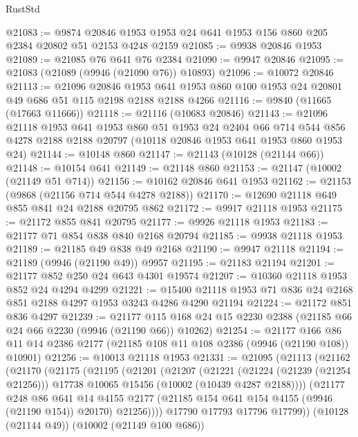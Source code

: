\begin{lexlean}{RustStd}
\begin{coremodule}
@21083 := @9874 @20846 @1953 @1953 @24 @641 @1953 @156 @860 @205 @2384 @20802 @51 @2153 @4248 @2159
@21085 := @9938 @20846 @1953
@21089 := @21085 @76 @641 @76 @2384
@21090 := @9947 @20846
@21095 := @21083 (@21089 (@9946 (@21090 @76)) @10893)
@21096 := @10072 @20846
@21113 := @21096
    @20846
    @1953
    @641
    @1953
    @860
    @100
    @1953
    @24
    @20801
    @49
    @686
    @51
    @115
    @2198
    @2188
    @2188
    @4266
@21116 := @9840 (@11665 (@17663 @11666))
@21118 := @21116 (@10683 @20846)
@21143 := @21096
    @21118
    @1953
    @641
    @1953
    @860
    @51
    @1953
    @24
    @2404
    @66
    @714
    @544
    @856
    @4278
    @2188
    @2188
    @20797
    (@10118 @20846 @1953 @641 @1953 @860 @1953 @24)
@21144 := @10148 @860
@21147 := @21143 (@10128 (@21144 @66))
@21148 := @10154 @641
@21149 := @21148 @860
@21153 := @21147 (@10002 (@21149 @51 @714))
@21156 := @10162 @20846 @641 @1953
@21162 := @21153 (@9868 (@21156 @714 @544 @4278 @2188))
@21170 := @12690 @21118 @649 @855 @841 @24 @2188 @20795 @862
@21172 := @9917 @21118 @1953
@21175 := @21172 @855 @841 @20795
@21177 := @9926 @21118 @1953
@21183 := @21177 @71 @854 @838 @840 @2168 @20794
@21185 := @9938 @21118 @1953
@21189 := @21185 @49 @838 @49 @2168
@21190 := @9947 @21118
@21194 := @21189 (@9946 (@21190 @49)) @9957
@21195 := @21183 @21194
@21201 := @21177 @852 @250 @24 @643 @4301 @19574
@21207 := @10360 @21118 @1953 @852 @24 @4294 @4299
@21221 := @15400 @21118 @1953 @71 @836 @24 @2168 @851 @2188 @4297 @1953 @3243 @4286 @4290 @21194
@21224 := @21172 @851 @836 @4297
@21239 := @21177
    @115
    @168
    @24
    @15
    @2230
    @2388
    (@21185 @66 @24 @66 @2230 (@9946 (@21190 @66)) @10262)
@21254 := @21177
    @166
    @86
    @11
    @14
    @2386
    @2177
    (@21185 @108 @11 @108 @2386 (@9946 (@21190 @108)) @10901)
@21256 := @10013 @21118 @1953
@21331 := @21095
    (@21113
      (@21162
        (@21170
          (@21175
            (@21195
              (@21201
                (@21207
                  (@21221
                    (@21224 (@21239 (@21254 @21256)))
                    @17738
                    @10065
                    @15456
                    (@10002 (@10439 @4287 @2188))))
                (@21177
                  @248
                  @86
                  @641
                  @14
                  @4155
                  @2177
                  (@21185 @154 @641 @154 @4155 (@9946 (@21190 @154)) @20170)
                  @21256))))
          @17790
          @17793
          @17796
          @17799))
      (@10128 (@21144 @49))
      (@10002 (@21149 @100 @686))

\end{coremodule}
\end{lexlean}
